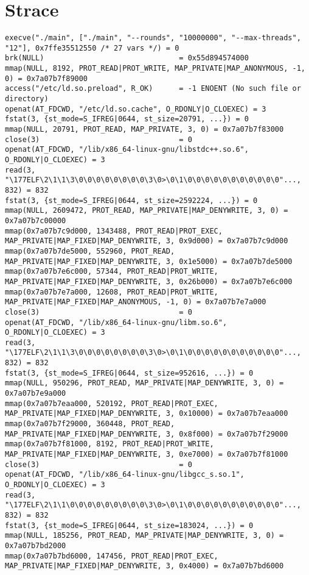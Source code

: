 \section{Strace}
\begin{verbatim}
execve("./main", ["./main", "--rounds", "10000000", "--max-threads", "12"], 0x7ffe35512550 /* 27 vars */) = 0
brk(NULL)                               = 0x55d894574000
mmap(NULL, 8192, PROT_READ|PROT_WRITE, MAP_PRIVATE|MAP_ANONYMOUS, -1, 0) = 0x7a07b7f89000
access("/etc/ld.so.preload", R_OK)      = -1 ENOENT (No such file or directory)
openat(AT_FDCWD, "/etc/ld.so.cache", O_RDONLY|O_CLOEXEC) = 3
fstat(3, {st_mode=S_IFREG|0644, st_size=20791, ...}) = 0
mmap(NULL, 20791, PROT_READ, MAP_PRIVATE, 3, 0) = 0x7a07b7f83000
close(3)                                = 0
openat(AT_FDCWD, "/lib/x86_64-linux-gnu/libstdc++.so.6", O_RDONLY|O_CLOEXEC) = 3
read(3, "\177ELF\2\1\1\3\0\0\0\0\0\0\0\0\3\0>\0\1\0\0\0\0\0\0\0\0\0\0\0"..., 832) = 832
fstat(3, {st_mode=S_IFREG|0644, st_size=2592224, ...}) = 0
mmap(NULL, 2609472, PROT_READ, MAP_PRIVATE|MAP_DENYWRITE, 3, 0) = 0x7a07b7c00000
mmap(0x7a07b7c9d000, 1343488, PROT_READ|PROT_EXEC, MAP_PRIVATE|MAP_FIXED|MAP_DENYWRITE, 3, 0x9d000) = 0x7a07b7c9d000
mmap(0x7a07b7de5000, 552960, PROT_READ, MAP_PRIVATE|MAP_FIXED|MAP_DENYWRITE, 3, 0x1e5000) = 0x7a07b7de5000
mmap(0x7a07b7e6c000, 57344, PROT_READ|PROT_WRITE, MAP_PRIVATE|MAP_FIXED|MAP_DENYWRITE, 3, 0x26b000) = 0x7a07b7e6c000
mmap(0x7a07b7e7a000, 12608, PROT_READ|PROT_WRITE, MAP_PRIVATE|MAP_FIXED|MAP_ANONYMOUS, -1, 0) = 0x7a07b7e7a000
close(3)                                = 0
openat(AT_FDCWD, "/lib/x86_64-linux-gnu/libm.so.6", O_RDONLY|O_CLOEXEC) = 3
read(3, "\177ELF\2\1\1\3\0\0\0\0\0\0\0\0\3\0>\0\1\0\0\0\0\0\0\0\0\0\0\0"..., 832) = 832
fstat(3, {st_mode=S_IFREG|0644, st_size=952616, ...}) = 0
mmap(NULL, 950296, PROT_READ, MAP_PRIVATE|MAP_DENYWRITE, 3, 0) = 0x7a07b7e9a000
mmap(0x7a07b7eaa000, 520192, PROT_READ|PROT_EXEC, MAP_PRIVATE|MAP_FIXED|MAP_DENYWRITE, 3, 0x10000) = 0x7a07b7eaa000
mmap(0x7a07b7f29000, 360448, PROT_READ, MAP_PRIVATE|MAP_FIXED|MAP_DENYWRITE, 3, 0x8f000) = 0x7a07b7f29000
mmap(0x7a07b7f81000, 8192, PROT_READ|PROT_WRITE, MAP_PRIVATE|MAP_FIXED|MAP_DENYWRITE, 3, 0xe7000) = 0x7a07b7f81000
close(3)                                = 0
openat(AT_FDCWD, "/lib/x86_64-linux-gnu/libgcc_s.so.1", O_RDONLY|O_CLOEXEC) = 3
read(3, "\177ELF\2\1\1\0\0\0\0\0\0\0\0\0\3\0>\0\1\0\0\0\0\0\0\0\0\0\0\0"..., 832) = 832
fstat(3, {st_mode=S_IFREG|0644, st_size=183024, ...}) = 0
mmap(NULL, 185256, PROT_READ, MAP_PRIVATE|MAP_DENYWRITE, 3, 0) = 0x7a07b7bd2000
mmap(0x7a07b7bd6000, 147456, PROT_READ|PROT_EXEC, MAP_PRIVATE|MAP_FIXED|MAP_DENYWRITE, 3, 0x4000) = 0x7a07b7bd6000

\end{verbatim}
